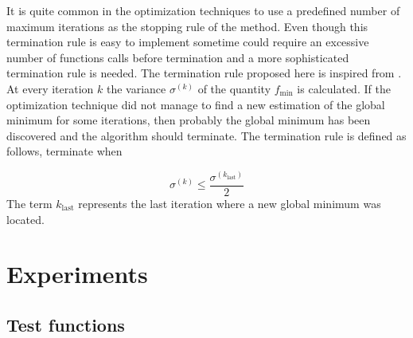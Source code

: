\documentclass[symmetry,article,submit,moreauthors,pdftex]{Definitions/mdpi}
\begin{document}
It is quite common in the optimization techniques to use a predefined
number of maximum iterations as the stopping rule of the method. Even
though this termination rule is easy to implement sometime could require
an excessive number of functions calls before termination and a more
sophisticated termination rule is needed.\textbf{ }The termination
rule proposed here is inspired from \cite{psotsoulos}. At every iteration
$k$ the variance\textbf{ $\sigma^{(k)}$ }of the quantity $f_{\mbox{min}}$
is calculated. If the optimization technique did not manage to find
a new estimation of the global minimum for some iterations, then probably the global minimum has been discovered and
 the algorithm should terminate. The termination rule
is defined as follows, terminate when 

\textbf{
\begin{equation}
\sigma^{(k)}\le\frac{\sigma^{\left(k_{\mbox{last}}\right)}}{2}\label{eq:termination_mine}
\end{equation}
}The term\textbf{ $k_{\mbox{last}}$ }represents the last iteration
where a new global minimum was located. 

\section{Experiments \label{sec:Experiments}}

\subsection{Test functions }
\end{document}
